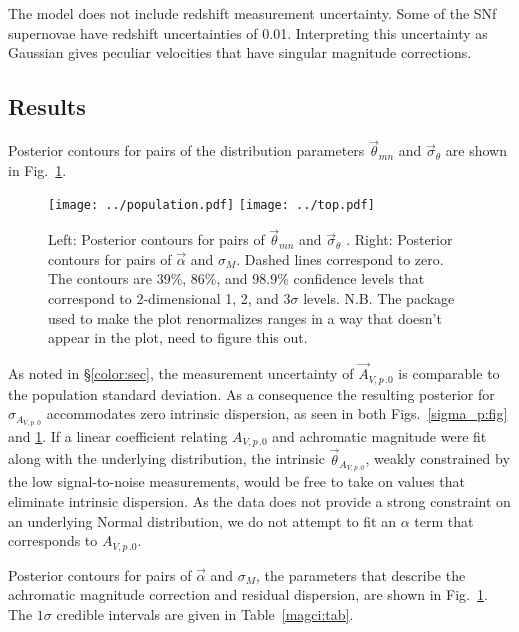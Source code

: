 \documentclass{aastex61}   	%
\begin{document}
The model does not include redshift measurement uncertainty.  Some of the SNf supernovae have redshift uncertainties of 0.01.  Interpreting
this uncertainty as Gaussian gives peculiar velocities that have singular magnitude corrections.

\subsection{Results}
\label{achromaticresults:sec}
Posterior contours for pairs of the distribution parameters
$\vec{\theta}_{\mathit{mn}}$ and
$\vec{\sigma}_{\theta}$ are shown in Fig.~\ref{confidence:fig}. 

\begin{figure}[htbp] %
   \centering
   \texttt{[image: ../population.pdf]}
   \texttt{[image: ../top.pdf]}
   \caption{Left: 
Posterior contours for pairs of
$\vec{\theta}_{\mathit{mn}}$ and
$\vec{\sigma}_{\theta}$ .  Right: Posterior contours for pairs of $\vec{\alpha}$ and
$\sigma_M$.  Dashed lines correspond to zero.
The contours are 39\%,  86\%, and 98.9\%   confidence levels that correspond to 2-dimensional 1, 2, and  3$\sigma$ levels.
N.B. The package used to make the plot renormalizes ranges in a way that doesn't appear in the plot, need
to figure  this out.
   \label{confidence:fig}}
\end{figure}

As noted in
\S\ref{color:sec}, the measurement uncertainty of ${\vec{A}_{V,p\,.0}}$ is comparable to the population standard deviation.  As a  consequence
the resulting
posterior for  $\sigma_{{A_{V,p\,.0}}}$  accommodates zero intrinsic dispersion, as
seen in both Figs.~\ref{sigma_p:fig} and \ref{confidence:fig}.  If 
a linear coefficient relating ${A_{V,p\,.0}}$
and achromatic magnitude were  fit along with the underlying distribution, the intrinsic  $\vec{\theta}_{A_{V,p\,.0}}$, weakly constrained by the 
low signal-to-noise measurements, would be
free to take on values that eliminate intrinsic dispersion.  As the data does not provide a strong constraint on an underlying Normal distribution,
we do not attempt to fit an $\alpha$ term that corresponds to  ${A_{V,p\,.0}}$.


Posterior contours for pairs  of $\vec{\alpha}$ and
$\sigma_M$, the parameters that describe the achromatic magnitude correction and residual dispersion, are shown in Fig.~\ref{confidence:fig}.
The $1\sigma$ credible intervals are given in Table~\ref{magci:tab}.
\end{document}
